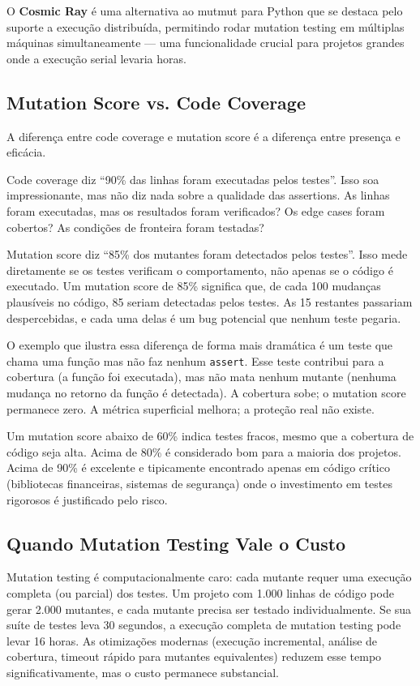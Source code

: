 O \textbf{Cosmic Ray} é uma alternativa ao mutmut para Python que se destaca
pelo suporte a execução distribuída, permitindo rodar mutation testing em
múltiplas máquinas simultaneamente --- uma funcionalidade crucial para projetos
grandes onde a execução serial levaria horas.

\subsection{Mutation Score vs. Code Coverage}

A diferença entre code coverage e mutation score é a diferença entre presença
e eficácia.

Code coverage diz ``90\% das linhas foram executadas pelos testes''. Isso soa
impressionante, mas não diz nada sobre a qualidade das assertions. As linhas
foram executadas, mas os resultados foram verificados? Os edge cases foram
cobertos? As condições de fronteira foram testadas?

Mutation score diz ``85\% dos mutantes foram detectados pelos testes''. Isso mede
diretamente se os testes verificam o comportamento, não apenas se o código é
executado. Um mutation score de 85\% significa que, de cada 100 mudanças
plausíveis no código, 85 seriam detectadas pelos testes. As 15 restantes
passariam despercebidas, e cada uma delas é um bug potencial que nenhum
teste pegaria.

O exemplo que ilustra essa diferença de forma mais dramática é um teste que
chama uma função mas não faz nenhum \texttt{assert}. Esse teste contribui para
a cobertura (a função foi executada), mas não mata nenhum mutante (nenhuma
mudança no retorno da função é detectada). A cobertura sobe; o mutation score
permanece zero. A métrica superficial melhora; a proteção real não existe.

Um mutation score abaixo de 60\% indica testes fracos, mesmo que a
cobertura de código seja alta. Acima de 80\% é considerado bom para a maioria
dos projetos. Acima de 90\% é excelente e tipicamente encontrado apenas em
código crítico (bibliotecas financeiras, sistemas de segurança) onde o
investimento em testes rigorosos é justificado pelo risco.

\subsection{Quando Mutation Testing Vale o Custo}

Mutation testing é computacionalmente caro: cada mutante requer uma execução
completa (ou parcial) dos testes. Um projeto com 1.000 linhas de código pode
gerar 2.000 mutantes, e cada mutante precisa ser testado individualmente. Se
sua suíte de testes leva 30 segundos, a execução completa de mutation testing
pode levar 16 horas. As otimizações modernas (execução incremental, análise de
cobertura, timeout rápido para mutantes equivalentes) reduzem esse tempo
significativamente, mas o custo permanece substancial.


